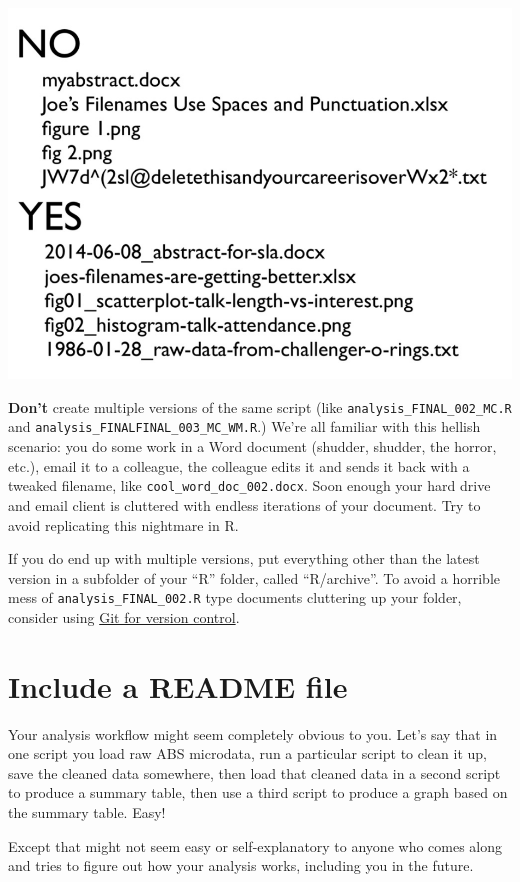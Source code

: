 \documentclass[]{book}
\begin{document}
\begin{center}\includegraphics[width=0.66\linewidth]{atlas/jenny_bryan_filenames} \end{center}

\textbf{Don't} create multiple versions of the same script (like \texttt{analysis\_FINAL\_002\_MC.R} and \texttt{analysis\_FINALFINAL\_003\_MC\_WM.R}.) We're all familiar with this hellish scenario: you do some work in a Word document (shudder, shudder, the horror, etc.), email it to a colleague, the colleague edits it and sends it back with a tweaked filename, like \texttt{cool\_word\_doc\_002.docx}. Soon enough your hard drive and email client is cluttered with endless iterations of your document. Try to avoid replicating this nightmare in R.

If you do end up with multiple versions, put everything other than the latest version in a subfolder of your ``R'' folder, called ``R/archive''. To avoid a horrible mess of \texttt{analysis\_FINAL\_002.R} type documents cluttering up your folder, consider using \protect\hyperlink{version-control}{Git for version control}.

\hypertarget{README}{%
\section{Include a README file}\label{README}}

Your analysis workflow might seem completely obvious to you. Let's say that in one script you load raw ABS microdata, run a particular script to clean it up, save the cleaned data somewhere, then load that cleaned data in a second script to produce a summary table, then use a third script to produce a graph based on the summary table. Easy!

Except that might not seem easy or self-explanatory to anyone who comes along and tries to figure out how your analysis works, including you in the future.
\end{document}
